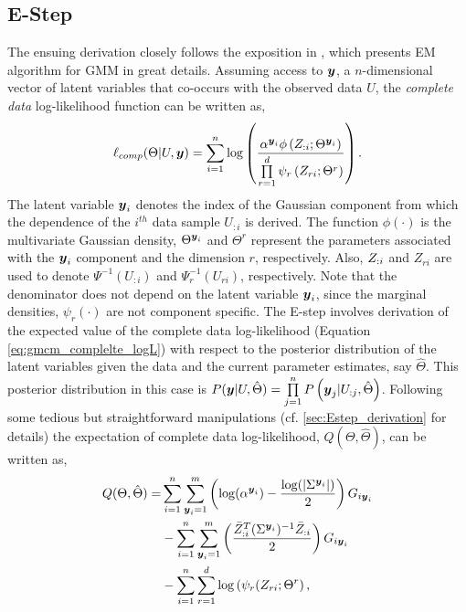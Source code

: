 \documentclass{article}
\theoremstyle{plain}
\theoremstyle{definition}
\theoremstyle{remark}
\begin{document}
\subsection{E-Step} \label{subsec:EStep}
The ensuing derivation closely follows the exposition in \citet{Bilmes98agentle}, which presents EM algorithm for GMM in great details. Assuming access to $\boldsymbol{y}$, a $n$-dimensional vector of latent variables that co-occurs with the observed data $U$, the \emph{complete data} log-likelihood function can be written as,
\begin{equation}\label{eq:gmcm_complelte_logL}
\ell_{comp}(\Theta |U,\boldsymbol{y})= \sum\limits_{i=1}^{n} \log \left( \frac{\alpha^{\boldsymbol{y}_i}\phi \left(Z_{:i};\Theta^{\boldsymbol{y}_i} \right)}{\prod\limits_{r=1}^{d}\psi_{r}\left(Z_{r{i}};\Theta^r \right)} \right) .
\end{equation}
The latent variable $\boldsymbol{y}_i$ denotes the index of the Gaussian component from which the dependence of the $i^{th}$ data sample $U_{:i}$ is derived. The function $\phi(\cdot)$ is the multivariate Gaussian density,  $\Theta^{\boldsymbol{y}_i}$ and $\Theta^r$ represent the parameters associated with the $\boldsymbol{y}_i$ component and the dimension $r$, respectively. Also, $Z_{:i}$ and $Z_{ri}$ are used to denote $\Psi^{-1}\left(U_{:i}\right)$ and $ \Psi_r^{-1}(U_{ri})$, respectively. Note that the denominator does not depend on the latent variable $\boldsymbol{y}_i$, since the marginal densities, $\psi_r(\cdot)$ are not component specific. The E-step involves derivation of the expected value of the complete data log-likelihood (Equation \ref{eq:gmcm_complelte_logL}) with respect to the posterior distribution of the latent variables given the data and the current parameter estimates, say $\hat{\Theta}$. This posterior distribution in this case is $P(\boldsymbol{y}|U,\hat{\Theta}) = \prod\limits_{j=1}^{n}P\left(\boldsymbol{y}_j|U_{:j},\hat{\Theta} \right)$. Following some tedious but straightforward manipulations (cf. \ref{sec:Estep_derivation} for details) the expectation of complete data log-likelihood, $Q(\Theta,\hat{\Theta})$, can be written as,
\begin{align}\label{eq:GEM_objective}
Q(\Theta,\hat{\Theta}) =&  \sum\limits_{i=1}^n \sum\limits_{\boldsymbol{y}_i=1}^m  \left( \log (\alpha^{\boldsymbol{y}_i}) - \frac{\log(|\Sigma^{\boldsymbol{y}_i}|)}{2}\right) G_{i\boldsymbol{y}_i}  \nonumber \\ 
& -\sum\limits_{i=1}^n \sum\limits_{\boldsymbol{y}_i=1}^m  \left( \frac{\bar{Z}_{:{i}}^T(\Sigma^{\boldsymbol{y}_i})^{-1}\bar{Z}_{:{i}}}{2} \right) G_{i\boldsymbol{y}_i}  \nonumber \\
& -\sum\limits_{i=1}^n \sum\limits_{r=1}^{d} \log \left(\psi_r(Z_{ri};\Theta^r \right) ,
\end{align}
\end{document}

